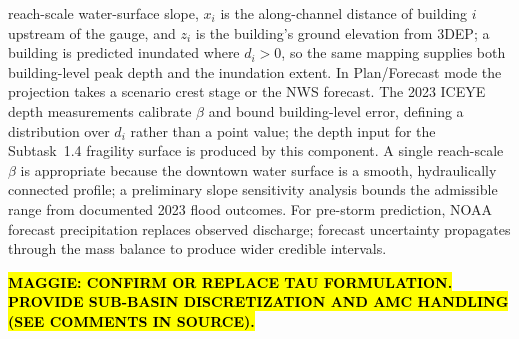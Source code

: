 \documentclass[11pt]{article}
\begin{document}
reach-scale water-surface slope, $x_i$ is the along-channel distance of building
$i$ upstream of the gauge, and $z_i$ is the building's ground elevation from
3DEP; a building is predicted inundated where $d_i > 0$, so the same mapping
supplies both building-level peak depth and the inundation extent.
In Plan/Forecast mode the projection takes a scenario crest stage or the NWS forecast.
The 2023 ICEYE depth measurements calibrate $\beta$ and bound building-level error,
defining a distribution over $d_i$ rather than a point value; the depth input for
the Subtask~1.4 fragility surface is produced by this component.
A single reach-scale $\beta$ is appropriate because the downtown water surface is
a smooth, hydraulically connected profile; a preliminary slope sensitivity analysis bounds the
admissible range from documented 2023 flood outcomes.
For pre-storm prediction, NOAA forecast precipitation replaces observed discharge;
forecast uncertainty propagates through the mass balance to produce wider credible
intervals.

\hl{\textbf{MAGGIE: CONFIRM OR REPLACE TAU FORMULATION. PROVIDE SUB-BASIN DISCRETIZATION AND AMC HANDLING (SEE COMMENTS IN SOURCE).}}

%
\end{document}
